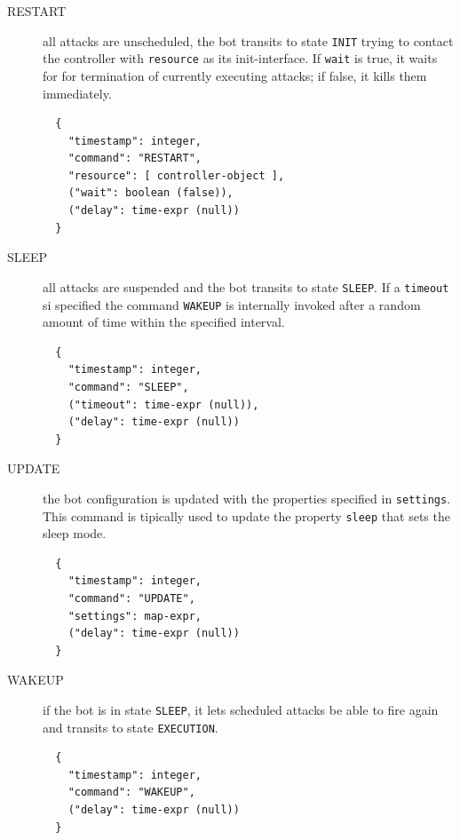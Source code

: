 \begin{description}
  \item[RESTART] all attacks are unscheduled, the bot transits to state \texttt{INIT} trying to contact the controller with \texttt{resource} as its init-interface.
  If \texttt{wait} is true, it waits for for termination of currently executing attacks; if false, it kills them immediately.

  \begin{verbatim}
  {
    "timestamp": integer,
    "command": "RESTART",
    "resource": [ controller-object ],
    ("wait": boolean (false)),
    ("delay": time-expr (null))
  }
  \end{verbatim}

  \item[SLEEP] all attacks are suspended and the bot transits to state \texttt{SLEEP}. If a \texttt{timeout} si specified the command \texttt{WAKEUP} is internally invoked after a random amount of time within the specified interval.

  \begin{verbatim}
  {
    "timestamp": integer,
    "command": "SLEEP",
    ("timeout": time-expr (null)),
    ("delay": time-expr (null))
  }
  \end{verbatim}

  \item[UPDATE] the bot configuration is updated with the properties specified in \texttt{settings}. This command is tipically used to update the property \texttt{sleep} that sets the sleep mode.

  \begin{verbatim}
  {
    "timestamp": integer,
    "command": "UPDATE",
    "settings": map-expr,
    ("delay": time-expr (null))
  }
  \end{verbatim}

  \item[WAKEUP] if the bot is in state \texttt{SLEEP}, it lets scheduled attacks be able to fire again and transits to state \texttt{EXECUTION}.

  \begin{verbatim}
  {
    "timestamp": integer,
    "command": "WAKEUP",
    ("delay": time-expr (null))
  }
  \end{verbatim}

\end{description}

